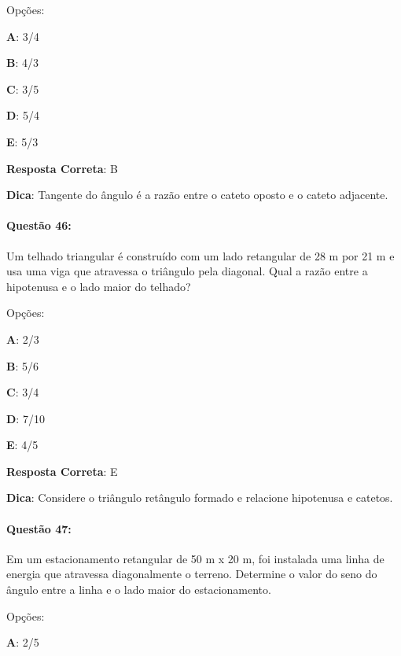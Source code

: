 \documentclass{article}
\begin{document}
\vspace{\baselineskip}Opções:

\vspace{\baselineskip}\textbf{A}: 3/4 

\textbf{B}: 4/3 

\textbf{C}: 3/5 

\textbf{D}: 5/4 

\textbf{E}: 5/3 

\vspace{\baselineskip}\textbf{Resposta Correta}: B

\vspace{\baselineskip}\textbf{Dica}: Tangente do ângulo é a razão entre o cateto oposto e o cateto adjacente.

\paragraph{Questão 46:}
{Um telhado triangular é construído com um lado retangular de 28 m por 21 m e usa uma viga que atravessa o triângulo pela diagonal. Qual a razão entre a hipotenusa e o lado maior do telhado?}

\vspace{\baselineskip}Opções:

\vspace{\baselineskip}\textbf{A}: 2/3 

\textbf{B}: 5/6 

\textbf{C}: 3/4 

\textbf{D}: 7/10 

\textbf{E}: 4/5 

\vspace{\baselineskip}\textbf{Resposta Correta}: E

\vspace{\baselineskip}\textbf{Dica}: Considere o triângulo retângulo formado e relacione hipotenusa e catetos.

\paragraph{Questão 47:}
{Em um estacionamento retangular de 50 m x 20 m, foi instalada uma linha de energia que atravessa diagonalmente o terreno. Determine o valor do seno do ângulo entre a linha e o lado maior do estacionamento.}

\vspace{\baselineskip}Opções:

\vspace{\baselineskip}\textbf{A}: 2/5 
\end{document}
